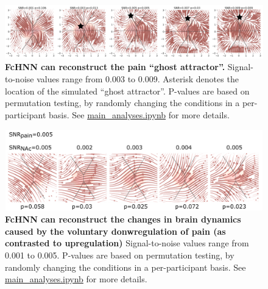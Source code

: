 \documentclass{article}
\begin{document}
\begin{figure}[!htbp]
\centering
\includegraphics[width=0.7\linewidth]{files/si_pain_ghost_attrac-959aa0ecc12eef8ee656ce183d03e576.png}
\caption[]{\textbf{FcHNN can reconstruct the pain ``ghost attractor''.}
Signal-to-noise values range from 0.003 to 0.009. Asterisk denotes the location of the simulated ``ghost attractor''. P-values are based on permutation testing, by randomly changing the conditions in a per-participant basis. See \href{https://github.com/pni-lab/connattractor/blob/master/notebooks/main\_analyses.ipynb}{main\_analyses.ipynb} for more details.}
\label{si_pain_ghost_attractor_sim}
\end{figure}

\begin{figure}[!htbp]
\centering
\includegraphics[width=0.7\linewidth]{files/si_downreg_trajector-2e491016119f9a4b6dd51e485480cfd5.png}
\caption[]{\textbf{FcHNN can reconstruct the changes in brain dynamics caused by the voluntary donwregulation of pain (as contrasted to upregulation)}
Signal-to-noise values range from 0.001 to 0.005. P-values are based on permutation testing, by randomly changing the conditions in a per-participant basis. See \href{https://github.com/pni-lab/connattractor/blob/master/notebooks/main\_analyses.ipynb}{main\_analyses.ipynb} for more details.}
\label{si_downreg_trajectory_sim}
\end{figure}
\end{document}
